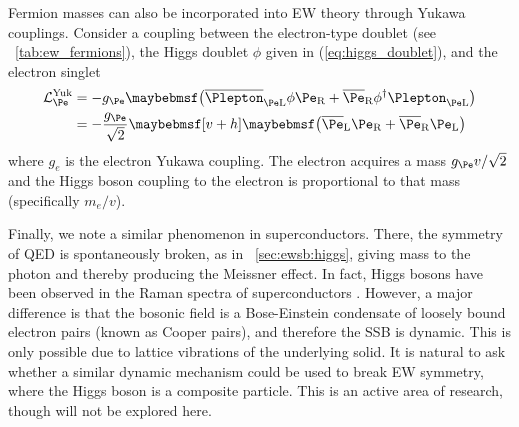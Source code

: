 Fermion masses can also be incorporated into EW theory through Yukawa couplings.
Consider a coupling between the electron-type  doublet (see 
\Table~\ref{tab:ew_fermions}), the Higgs doublet $\phi$ given in 
(\ref{eq:higgs_doublet}), and the electron  singlet
\begin{align}
	\mathcal{L}_{\Pe}^{\text{Yuk}} &= -g_{\Pe} \parenths{\overline{\Plepton}_{\Pe \text{L}} \phi \Pe_{\text{R}} + \overline{\Pe}_{\text{R}} \phi^{\dagger} \Plepton_{\Pe \text{L}}} \\
	&= -\frac{g_{\Pe}}{\sqrt{2}} \sqbracs{v + h} \parenths{\overline{\Pe}_{\text{L}} \Pe_{\text{R}} + \overline{\Pe}_{\text{R}} \Pe_{\text{L}}}
\end{align}
where $g_e$ is the electron Yukawa coupling. The electron acquires a mass 
$g_{\Pe}v/\sqrt{2}$ and the Higgs boson coupling to the electron is proportional 
to that mass (specifically $m_e/v$).

Finally, we note a similar phenomenon in superconductors. There, the  symmetry 
of QED is spontaneously broken, as in \Section~\ref{sec:ewsb:higgs}, giving mass to 
the photon and thereby producing the Meissner effect. In fact, Higgs bosons have been 
observed in the Raman spectra of superconductors \cite{Superconductivity}. However, a 
major difference is that the bosonic field is a Bose-Einstein condensate of loosely bound 
electron pairs (known as Cooper pairs), and therefore the SSB is dynamic. This is 
only possible due to lattice vibrations of the underlying solid. It is natural to ask 
whether a similar dynamic mechanism could be used to break EW symmetry, where the 
Higgs boson is a composite particle. This is an active area of research, though will not 
be explored here.
